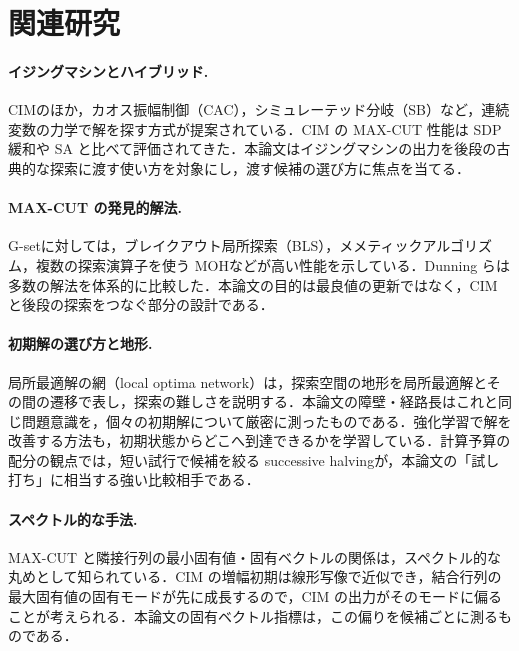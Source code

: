 \section{関連研究}\label{sec:related}

\paragraph{イジングマシンとハイブリッド.} CIM\cite{wang2013,inagaki2016,mcmahon2016}のほか，カオス振幅制御（CAC）\cite{leleu2019}，シミュレーテッド分岐（SB）\cite{goto2019}など，連続変数の力学で解を探す方式が提案されている．CIM の MAX-CUT 性能は SDP 緩和\cite{goemans1995}や SA と比べて評価されてきた\cite{haribara2015}．本論文はイジングマシンの出力を後段の古典的な探索に渡す使い方を対象にし，渡す候補の選び方に焦点を当てる．

\paragraph{MAX-CUT の発見的解法.} G-set\cite{helmberg2000}に対しては，ブレイクアウト局所探索（BLS）\cite{benlic2013}，メメティックアルゴリズム\cite{wu2012}，複数の探索演算子を使う MOH\cite{ma2017}などが高い性能を示している．Dunning ら\cite{dunning2018}は多数の解法を体系的に比較した．本論文の目的は最良値の更新ではなく，CIM と後段の探索をつなぐ部分の設計である．

\paragraph{初期解の選び方と地形.} 局所最適解の網（local optima network）\cite{ochoa2008}は，探索空間の地形を局所最適解とその間の遷移で表し，探索の難しさを説明する．本論文の障壁・経路長はこれと同じ問題意識を，個々の初期解について厳密に測ったものである．強化学習で解を改善する方法\cite{barrett2020}も，初期状態からどこへ到達できるかを学習している．計算予算の配分の観点では，短い試行で候補を絞る successive halving\cite{karnin2013,jamieson2016}が，本論文の「試し打ち」に相当する強い比較相手である．

\paragraph{スペクトル的な手法.} MAX-CUT と隣接行列の最小固有値・固有ベクトルの関係は，スペクトル的な丸めとして知られている\cite{trevisan2012}．CIM の増幅初期は線形写像で近似でき，結合行列の最大固有値の固有モードが先に成長するので，CIM の出力がそのモードに偏ることが考えられる．本論文の固有ベクトル指標は，この偏りを候補ごとに測るものである．

